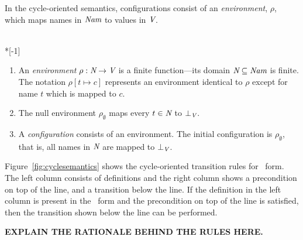 \documentclass[12pt,titlepage]{article}
\begin{document}
In the cycle-oriented semantics, configurations consist of an
\emph{environment}, $\rho$, which maps
names in ${\mbox{\em Nam}}$ to values in ${\mbox{\em V}}$.

\begin{definition}~\\*[-1\baselineskip]
\begin{enumerate}
\item An \emph{environment} $\rho: {\mbox{\em N}} \to {\mbox{\em V}}$ is a
finite function---its domain ${\mbox{\em N}} \subseteq {\mbox{\em Nam}}$ is
finite.  The notation $\rho[t\mapsto c]$ represents an environment
identical to $\rho$ except for name $t$ which is mapped to $c$.
\item The null environment $\rho_\emptyset$ maps every $t\in{\mbox{\em N}}$ to
$\bot_{\mbox{\scriptsize\em V}}$.
\item A \emph{configuration} consists of an environment.  The initial
configuration is $\rho_\emptyset$, that is, all names in ${\mbox{\em N}}$
are mapped to $\bot_{\mbox{\scriptsize\em V}}$.
\end{enumerate}
\end{definition}

Figure~\vref{fig:cyclesemantics} shows the cycle-oriented transition
rules for \ssiplus\ form.  The left column consists of definitions and
the right column shows a precondition on top of the line, and a
transition below the line.  If the definition in the left column is
present in the \ssiplus\ form and the precondition on top of the line
is satisfied, then the transition shown below the line can be performed.

\textbf{EXPLAIN THE RATIONALE BEHIND THE RULES HERE.}
\end{document}
